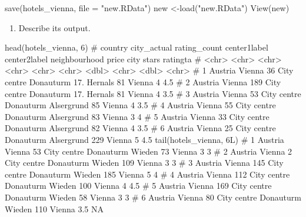 \documentclass[
]{article}
\newenvironment{Shaded}{\begin{snugshade}}{\end{snugshade}}
\newcommand{\NormalTok}[1]{#1}
\providecommand{\tightlist}{%
  \setlength{\itemsep}{0pt}\setlength{\parskip}{0pt}}
\begin{document}
\begin{Shaded}
\begin{Highlighting}[]
\NormalTok{save(hotels\_vienna, file = "new.RData")}
\NormalTok{new \textless{}{-}load("new.RData")}
\NormalTok{View(new)}
\end{Highlighting}
\end{Shaded}

\begin{enumerate}
\def\labelenumi{\alph{enumi}.}
\setcounter{enumi}{4}
\tightlist
\item
  Describe its output.
\end{enumerate}

\begin{Shaded}
\begin{Highlighting}[]
\NormalTok{head(hotels\_vienna, 6) }
\NormalTok{\# country city\_actual rating\_count center1label center2label neighbourhood price city   stars ratingta}
\NormalTok{\# \textless{}chr\textgreater{}   \textless{}chr\textgreater{}       \textless{}chr\textgreater{}        \textless{}chr\textgreater{}        \textless{}chr\textgreater{}        \textless{}chr\textgreater{}         \textless{}dbl\textgreater{} \textless{}chr\textgreater{}  \textless{}dbl\textgreater{} \textless{}chr\textgreater{}   }
\NormalTok{\# 1 Austria Vienna      36           City centre  Donauturm    17. Hernals      81 Vienna     4 4.5     }
\NormalTok{\# 2 Austria Vienna      189          City centre  Donauturm    17. Hernals      81 Vienna     4 3.5     }
\NormalTok{\# 3 Austria Vienna      53           City centre  Donauturm    Alsergrund       85 Vienna     4 3.5     }
\NormalTok{\# 4 Austria Vienna      55           City centre  Donauturm    Alsergrund       83 Vienna     3 4       }
\NormalTok{\# 5 Austria Vienna      33           City centre  Donauturm    Alsergrund       82 Vienna     4 3.5     }
\NormalTok{\# 6 Austria Vienna      25           City centre  Donauturm    Alsergrund      229 Vienna     5 4.5  }
\NormalTok{tail(hotels\_vienna, 6L)}
\NormalTok{\# 1 Austria Vienna      53           City centre  Donauturm    Wieden           73 Vienna   3   3       }
\NormalTok{\# 2 Austria Vienna      2            City centre  Donauturm    Wieden          109 Vienna   3   3       }
\NormalTok{\# 3 Austria Vienna      145          City centre  Donauturm    Wieden          185 Vienna   5   4       }
\NormalTok{\# 4 Austria Vienna      112          City centre  Donauturm    Wieden          100 Vienna   4   4.5     }
\NormalTok{\# 5 Austria Vienna      169          City centre  Donauturm    Wieden           58 Vienna   3   3       }
\NormalTok{\# 6 Austria Vienna      80           City centre  Donauturm    Wieden          110 Vienna   3.5 NA   }
\end{Highlighting}
\end{Shaded}
\end{document}
